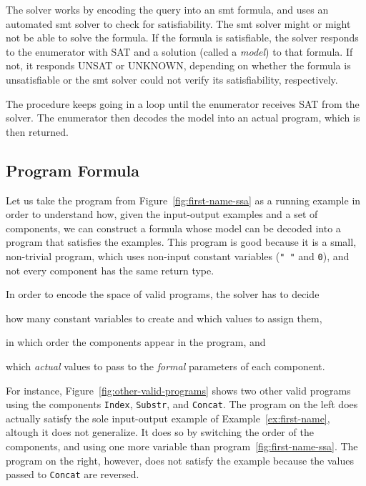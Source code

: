 The solver works by encoding the query into an \gls{smt} formula, and uses an
automated \gls{smt} solver to check for satisfiability. The \gls{smt} solver
might or might not be able to solve the formula. If the formula is satisfiable,
the solver responds to the enumerator with SAT and a solution (called a
\textit{model}) to that formula. If not, it responds UNSAT or UNKNOWN, depending
on whether the formula is unsatisfiable or the \gls{smt} solver could not verify
its satisfiability, respectively.

The procedure keeps going in a loop until the enumerator receives SAT from the
solver. The enumerator then decodes the model into an actual program, which is
then returned.

\subsection{Program Formula}
\label{sec:program-formula}

Let us take the program from Figure~\ref{fig:first-name-ssa} as a running
example in order to understand how, given the input-output examples and a set of
components, we can construct a formula whose model can be decoded into a program
that satisfies the examples. This program is good because it is a small,
non-trivial program, which uses non-input constant variables (\lstinline{" "}
and \lstinline{0}), and not every component has the same return type.

In order to encode the space of valid programs, the solver has to decide
\begin{enumerate*}[(1)]
\item how many constant variables to create and which values to assign them,
\item in which order the components appear in the program, and
\item which \textit{actual} values to pass to the \textit{formal} parameters of
  each component.
\end{enumerate*}

For instance, Figure~\ref{fig:other-valid-programs} shows two other valid
programs using the components \lstinline{Index}, \lstinline{Substr}, and
\lstinline{Concat}. The program on the left does actually satisfy the sole
input-output example of Example~\ref{ex:first-name}, altough it does not
generalize. It does so by switching the order of the components, and using one
more variable than program~\ref{fig:first-name-ssa}. The program on the right,
however, does not satisfy the example because the values passed to
\lstinline{Concat} are reversed.

